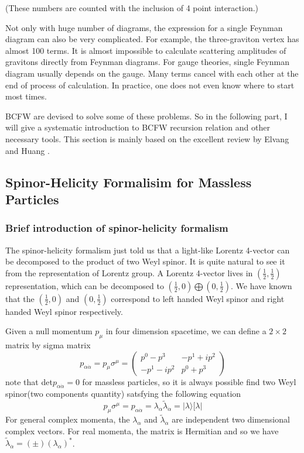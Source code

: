 \documentclass[12pt]{article}
\numberwithin{equation}{section}
\newcommand{\aket}[1]{|#1\rangle}
\begin{document}
\noindent
{
(These numbers are counted with the inclusion of 4 point interaction.)}

Not only with huge number
of diagrams, the expression for a single Feynman diagram can also be very complicated. For example, the
three-graviton vertex has almost 100 terms. It is almost impossible to calculate scattering amplitudes of
gravitons directly from Feynman diagrams. For gauge theories, single Feynman diagram usually depends
on the gauge. Many terms cancel with each other at the end of process of calculation. In practice, one does not
even know where to start most times.

BCFW are devised to solve some of these problems. So in the following part, I will give a systematic introduction to BCFW
recursion relation and other necessary tools. This section is mainly based on the excellent review by Elvang and Huang \cite{Elvang:2013cua}.
\subsection{Spinor-Helicity Formalisim for Massless Particles}
\subsubsection{Brief introduction of spinor-helicity formalism}
The spinor-helicity formalism just told us that a light-like Lorentz 4-vector can be decomposed to the product of 
two Weyl spinor. It is quite natural to see it from the representation of Lorentz group. A Lorentz 4-vector lives in $(\frac{1}{2},\frac{1}{2})$ representation,
which can be decomposed to $(\frac{1}{2},0)\bigoplus (0,\frac{1}{2})$. We have known that the $(\frac{1}{2},0)$ and $(0,\frac{1}{2})$ correspond to left handed Weyl spinor and 
right handed Weyl spinor respectively.

Given a null momentum $p_\mu$ in four dimension spacetime, we can define a $2\times2$ matrix by sigma matrix 
\begin{equation*}
    p_{\alpha\dot{\alpha}}=p_\mu\sigma^\mu=\begin{pmatrix}
        p^0-p^3 & -p^1+ip^2\\
        -p^1-ip^2 & p^0+p^3
    \end{pmatrix}
\end{equation*}
note that det$p_{\alpha\dot{\alpha}}=0$ for massless particles, so it is always possible find two Weyl spinor(two components quantity) satsfying the following equation
\begin{equation}
    p_\mu \sigma^\mu=p_{\alpha\dot{\alpha}}=\lambda_\alpha \tilde{\lambda}_{\dot{\alpha}}=\aket{\lambda}[\lambda|
    \label{2.1}
\end{equation}
For general complex momenta, the $\lambda_\alpha$ and $\tilde{\lambda}_{\dot{\alpha}}$ are independent two dimensional complex vectors. For real momenta, the matrix is Hermitian and 
so we have $\tilde{\lambda}_{\dot{\alpha}}=(\pm)(\lambda_\alpha)^*$.
\end{document}
